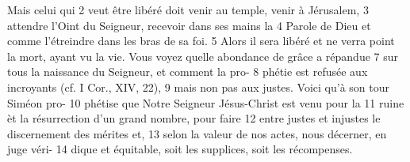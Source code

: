Mais celui qui	 
2	 	veut être libéré doit venir au temple, venir à Jérusalem,	 
3	 	attendre l'Oint du Seigneur, recevoir dans ses mains la	 
4	 	Parole de Dieu et comme l'étreindre dans les bras de sa foi.	 
5	 	Alors il sera libéré et ne verra point la mort, ayant vu la vie.
Vous voyez quelle abondance de grâce a répandue	 
7	 	sur tous la naissance du Seigneur, et comment la pro-	 
8	 	phétie est refusée aux incroyants (cf. I Cor., XIV, 22),	 
9	 	mais non pas aux justes. Voici qu'à son tour Siméon pro-	 
10	 	phétise que Notre Seigneur Jésus-Christ est venu pour la	 
11	 	ruine èt la résurrection d'un grand nombre, pour faire	 
12	 	entre justes et injustes le discernement des mérites et,	 
13	 	selon la valeur de nos actes, nous décerner, en juge véri-	 
14	 	dique et équitable, soit les supplices, soit les récompenses.